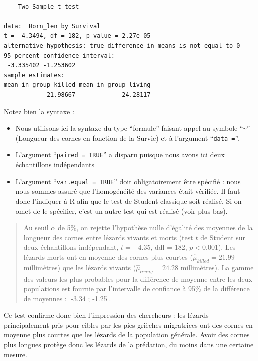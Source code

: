 \documentclass[a4paperpaper,]{article}
\providecommand{\tightlist}{%
  \setlength{\itemsep}{0pt}\setlength{\parskip}{0pt}}
\begin{document}
\begin{verbatim}

    Two Sample t-test

data:  Horn_len by Survival
t = -4.3494, df = 182, p-value = 2.27e-05
alternative hypothesis: true difference in means is not equal to 0
95 percent confidence interval:
 -3.335402 -1.253602
sample estimates:
mean in group killed mean in group living 
            21.98667             24.28117 
\end{verbatim}

Notez bien la syntaxe :

\begin{itemize}
\tightlist
\item
  Nous utilisons ici la syntaxe du type ``formule'' faisant appel au symbole ``\texttt{\textasciitilde{}}'' (Longueur des cornes en fonction de la Survie) et à l'argument ``\texttt{data\ =}''.
\item
  L'argument ``\texttt{paired\ =\ TRUE}'' a disparu puisque nous avons ici deux échantillons indépendants
\item
  L'argument ``\texttt{var.equal\ =\ TRUE}'' doit obligatoirement être spécifié : nous nous sommes assuré que l'homogénéité des variances était vérifiée. Il faut donc l'indiquer à R afin que le test de Student classique soit réalisé. Si on omet de le spécifier, c'est un autre test qui est réalisé (voir plus bas).
\end{itemize}

\begin{quote}
Au seuil \(\alpha\) de 5\%, on rejette l'hypothèse nulle d'égalité des moyennes de la longueur des cornes entre lézards vivants et morts (test \(t\) de Student sur deux échantillons indépendant, \(t = -4.35\), ddl = 182, \(p < 0.001\)). Les lézards morts ont en moyenne des cornes plus courtes (\(\hat{\mu}_{killed} = 21.99\) millimètres) que les lézards vivants (\(\hat{\mu}_{living} = 24.28\) millimètres). La gamme des valeurs les plus probables pour la différence de moyenne entre les deux populations est fournie par l'intervalle de confiance à 95\% de la différence de moyennes : {[}-3.34 ; -1.25{]}.
\end{quote}

Ce test confirme donc bien l'impression des chercheurs : les lézards principalement pris pour cibles par les pies grièches migratrices ont des cornes en moyenne plus courtes que les lézards de la population générale. Avoir des cornes plus longues protège donc les lézards de la prédation, du moins dans une certaine mesure.
\end{document}
